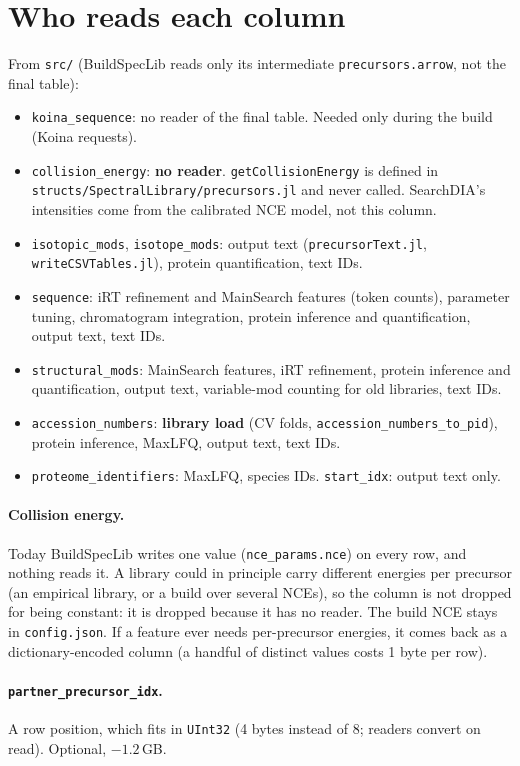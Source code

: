 \documentclass[10pt]{article}
\newcommand{\code}[1]{\texttt{#1}}
\begin{document}
\section{Who reads each column}
From \code{src/} (BuildSpecLib reads only its intermediate \code{precursors.arrow}, not the final table):
\begin{itemize}
\item \code{koina\_sequence}: no reader of the final table. Needed only during the build (Koina requests).
\item \code{collision\_energy}: \textbf{no reader}. \code{getCollisionEnergy} is defined in
  \code{structs/SpectralLibrary/precursors.jl} and never called. SearchDIA's intensities come from the
  calibrated NCE model, not this column.
\item \code{isotopic\_mods}, \code{isotope\_mods}: output text (\code{precursorText.jl}, \code{writeCSVTables.jl}),
  protein quantification, text IDs.
\item \code{sequence}: iRT refinement and MainSearch features (token counts), parameter tuning, chromatogram
  integration, protein inference and quantification, output text, text IDs.
\item \code{structural\_mods}: MainSearch features, iRT refinement, protein inference and quantification,
  output text, variable-mod counting for old libraries, text IDs.
\item \code{accession\_numbers}: \textbf{library load} (CV folds, \code{accession\_numbers\_to\_pid}), protein
  inference, MaxLFQ, output text, text IDs.
\item \code{proteome\_identifiers}: MaxLFQ, species IDs. \code{start\_idx}: output text only.
\end{itemize}

\paragraph{Collision energy.} Today BuildSpecLib writes one value (\code{nce\_params.nce}) on every row, and
nothing reads it. A library could in principle carry different energies per precursor (an empirical library, or a
build over several NCEs), so the column is not dropped for being constant: it is dropped because it has no reader.
The build NCE stays in \code{config.json}. If a feature ever needs per-precursor energies, it comes back as a
dictionary-encoded column (a handful of distinct values costs 1 byte per row).

\paragraph{\code{partner\_precursor\_idx}.} A row position, which fits in \code{UInt32} (4 bytes instead of 8; readers
convert on read). Optional, $-1.2$\,GB.
\end{document}
